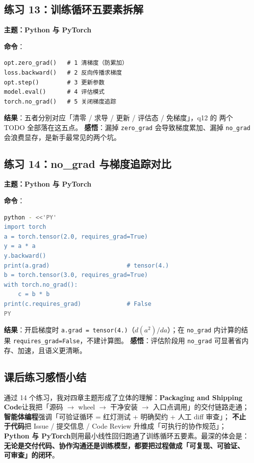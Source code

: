 \documentclass{hamesome-report}
\begin{document}
\subsection{练习 13：训练循环五要素拆解}
\textbf{主题：Python 与 PyTorch}\par
\textbf{命令}：
\begin{lstlisting}[language={}]
opt.zero_grad()   # 1 清梯度（防累加）
loss.backward()   # 2 反向传播求梯度
opt.step()        # 3 更新参数
model.eval()      # 4 评估模式
torch.no_grad()   # 5 关闭梯度追踪
\end{lstlisting}
\textbf{结果}：五者分别对应「清零 / 求导 / 更新 / 评估态 / 免梯度」，q12 的
两个 TODO 全部落在这五点。
\textbf{感悟}：漏掉 \texttt{zero\_grad} 会导致梯度累加、漏掉
\texttt{no\_grad} 会浪费显存，是新手最常见的两个坑。

\subsection{练习 14：no\_grad 与梯度追踪对比}
\textbf{主题：Python 与 PyTorch}\par
\textbf{命令}：
\begin{lstlisting}[language=bash]
python - <<'PY'
import torch
a = torch.tensor(2.0, requires_grad=True)
y = a * a
y.backward()
print(a.grad)                      # tensor(4.)
b = torch.tensor(3.0, requires_grad=True)
with torch.no_grad():
    c = b * b
print(c.requires_grad)             # False
PY
\end{lstlisting}
\textbf{结果}：开启梯度时 \texttt{a.grad = tensor(4.)}（$d(a^2)/da$）；在
\texttt{no\_grad} 内计算的结果 \texttt{requires\_grad=False}，不建计算图。
\textbf{感悟}：评估阶段用 \texttt{no\_grad} 可显著省内存、加速，且语义更清晰。

\subsection{课后练习感悟小结}
通过 14 个练习，我对四章主题形成了立体的理解：\textbf{Packaging and Shipping
Code}让我把「源码 $\to$ wheel $\to$ 干净安装 $\to$ 入口点调用」的交付链路走通；
\textbf{智能体编程}强调「可验证循环 = 红灯测试 + 明确契约 + 人工 diff 审查」；
\textbf{不止于代码}把 Issue / 提交信息 / Code Review 升维成「可执行的协作规范」；
\textbf{Python 与 PyTorch}则用最小线性回归跑通了训练循环五要素。最深的体会是：
\textbf{无论是交付代码、协作沟通还是训练模型，都要把过程做成「可复现、可验证、
可审查」的闭环}。
\end{document}
